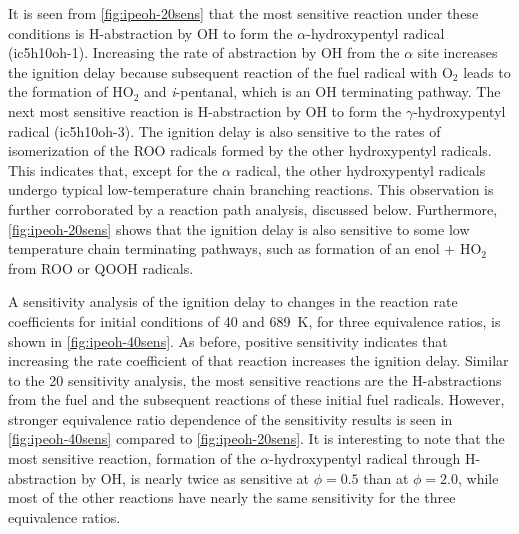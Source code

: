 \documentclass[../main.tex]{subfiles}
\begin{document}
It is seen from \cref{fig:ipeoh-20sens} that the most sensitive reaction
under these conditions is H-abstraction by OH to form the $\alpha$-hydroxypentyl
radical (ic5h10oh-1). Increasing the rate of abstraction by OH from the
$\alpha$ site increases the ignition delay because subsequent reaction
of the fuel radical with O$_2$ leads to the formation of HO$_2$ and
\textit{i}-pentanal, which is an OH terminating pathway. The next most
sensitive reaction is H-abstraction by OH to form the $\gamma$-hydroxypentyl
radical (ic5h10oh-3). The ignition delay is also sensitive to the rates of
isomerization of the ROO radicals formed by the other hydroxypentyl
radicals. This indicates that, except for the $\alpha$ radical, the
other hydroxypentyl radicals undergo typical low-temperature chain branching
reactions. This observation is further corroborated by a reaction path
analysis, discussed below. Furthermore, \cref{fig:ipeoh-20sens} shows that
the ignition delay is also sensitive to some low temperature chain
terminating pathways, such as formation of an enol + HO$_2$ from ROO
or QOOH radicals.

A sensitivity analysis of the ignition delay to changes in the
reaction rate coefficients for initial conditions of \SI{40}{\atmosphere}
and \SI{689}{\kelvin}, for three equivalence ratios, is shown in
\cref{fig:ipeoh-40sens}. As before, positive sensitivity indicates
that increasing the rate coefficient of that reaction increases the
ignition delay. Similar to the \SI{20}{\atmosphere} sensitivity analysis,
the most sensitive reactions are the H-abstractions from the fuel and
the subsequent reactions of these initial fuel radicals. However,
stronger equivalence ratio dependence of the sensitivity results is
seen in \cref{fig:ipeoh-40sens} compared to \cref{fig:ipeoh-20sens}.
It is interesting to note that the most sensitive reaction, formation
of the $\alpha$-hydroxypentyl radical through H-abstraction by
OH, is nearly twice as sensitive at $\phi=0.5$ than at $\phi=2.0$, while
most of the other reactions have nearly the same sensitivity for
the three equivalence ratios.
\end{document}
